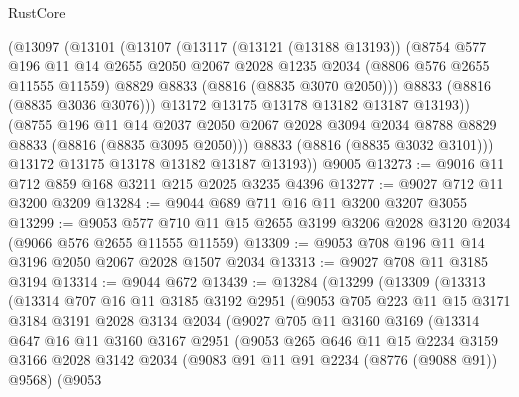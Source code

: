 \begin{lexlean}{RustCore}
\begin{coremodule}
        (@13097
          (@13101
            (@13107
              (@13117
                (@13121 (@13188 @13193))
                (@8754
                  @577
                  @196
                  @11
                  @14
                  @2655
                  @2050
                  @2067
                  @2028
                  @1235
                  @2034
                  (@8806 @576 @2655 @11555 @11559)
                  @8829
                  @8833
                  (@8816 (@8835 @3070 @2050)))
                @8833
                (@8816 (@8835 @3036 @3076)))
              @13172
              @13175
              @13178
              @13182
              @13187
              @13193))
          (@8755
            @196
            @11
            @14
            @2037
            @2050
            @2067
            @2028
            @3094
            @2034
            @8788
            @8829
            @8833
            (@8816 (@8835 @3095 @2050)))
          @8833
          (@8816 (@8835 @3032 @3101)))
        @13172
        @13175
        @13178
        @13182
        @13187
        @13193))
    @9005
@13273 := @9016 @11 @712 @859 @168 @3211 @215 @2025 @3235 @4396
@13277 := @9027 @712 @11 @3200 @3209
@13284 := @9044 @689 @711 @16 @11 @3200 @3207 @3055
@13299 := @9053
    @577
    @710
    @11
    @15
    @2655
    @3199
    @3206
    @2028
    @3120
    @2034
    (@9066 @576 @2655 @11555 @11559)
@13309 := @9053 @708 @196 @11 @14 @3196 @2050 @2067 @2028 @1507 @2034
@13313 := @9027 @708 @11 @3185 @3194
@13314 := @9044 @672
@13439 := @13284
    (@13299
      (@13309
        (@13313
          (@13314
            @707
            @16
            @11
            @3185
            @3192
            @2951
            (@9053
              @705
              @223
              @11
              @15
              @3171
              @3184
              @3191
              @2028
              @3134
              @2034
              (@9027
                @705
                @11
                @3160
                @3169
                (@13314
                  @647
                  @16
                  @11
                  @3160
                  @3167
                  @2951
                  (@9053
                    @265
                    @646
                    @11
                    @15
                    @2234
                    @3159
                    @3166
                    @2028
                    @3142
                    @2034
                    (@9083 @91 @11 @91 @2234 (@8776 (@9088 @91)) @9568)
                    (@9053

\end{coremodule}
\end{lexlean}
